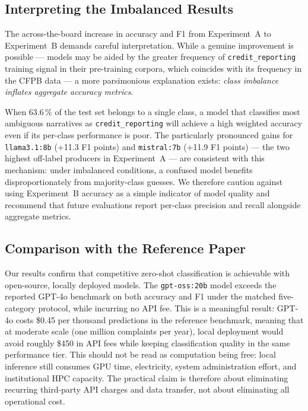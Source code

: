 \documentclass[journal]{IEEEtran}
\begin{document}
\subsection{Interpreting the Imbalanced Results}

The across-the-board increase in accuracy and F1 from Experiment~A
to Experiment~B demands careful interpretation. While a genuine
improvement is possible — models may be aided by the greater
frequency of \texttt{credit\_reporting} training signal in
their pre-training corpora, which coincides with its frequency in
the CFPB data — a more parsimonious explanation exists:
\emph{class imbalance inflates aggregate accuracy metrics}.

When 63.6\,\% of the test set belongs to a single class, a model
that classifies most ambiguous narratives as \texttt{credit\_reporting}
will achieve a high weighted accuracy even if its per-class performance
is poor. The particularly pronounced gains for \texttt{llama3.1:8b}
(+11.3 F1 points) and \texttt{mistral:7b} (+11.9 F1 points) — the
two highest off-label producers in Experiment~A — are consistent
with this mechanism: under imbalanced conditions, a confused model
benefits disproportionately from majority-class guesses. We therefore
caution against using Experiment~B accuracy as a simple indicator of
model quality and recommend that future evaluations report per-class
precision and recall alongside aggregate metrics.

\subsection{Comparison with the Reference Paper}

Our results confirm that competitive zero-shot classification is
achievable with open-source, locally deployed models. The
\texttt{gpt-oss:20b} model exceeds the reported GPT-4o benchmark on
both accuracy and F1 under the matched five-category protocol, while
incurring no API fee. This is a meaningful result: GPT-4o costs
\$0.45 per thousand predictions in the reference benchmark, meaning
that at moderate scale (one million complaints per year), local
deployment would avoid roughly \$450 in API fees while keeping
classification quality in the same performance tier. This should not
be read as computation being free: local inference still consumes GPU
time, electricity, system administration effort, and institutional HPC
capacity. The practical claim is therefore about eliminating recurring
third-party API charges and data transfer, not about eliminating all
operational cost.
\end{document}
